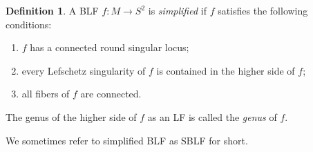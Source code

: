 \documentclass{amsart}
\theoremstyle{plain}
\theoremstyle{definition}
\newtheorem{defn}[thm]{Definition}
\begin{document}
\begin{defn}

A BLF $f:M\rightarrow S^2$ is {\it simplified} if $f$ satisfies the following conditions: 

\begin{enumerate}[(1)]

\item $f$ has a connected round singular locus; 

\item every Lefschetz singularity of $f$ is contained in the higher side of $f$; 

\item all fibers of $f$ are connected. 

\end{enumerate}

The genus of the higher side of $f$ as an LF is called the {\it genus} of $f$. 

\end{defn}

We sometimes refer to simplified BLF as SBLF for short. 
\end{document}

